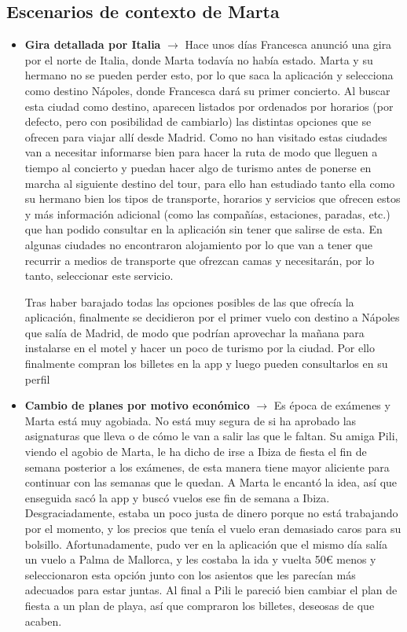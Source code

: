 \subsection{Escenarios de contexto de Marta}
\begin{itemize}
      \item \textbf{Gira detallada por Italia} $\rightarrow$ Hace unos días Francesca anunció una gira por el norte de Italia, donde Marta todavía no había estado. Marta y su hermano no se pueden perder esto, por lo que saca la aplicación y selecciona como destino Nápoles, donde Francesca dará su primer concierto. Al buscar esta ciudad como destino, aparecen listados por ordenados por horarios (por defecto, pero con posibilidad de cambiarlo) las distintas opciones que se ofrecen para viajar allí desde Madrid. Como no han visitado estas ciudades van a necesitar informarse bien para hacer la ruta de modo que lleguen a tiempo al concierto y puedan hacer algo de turismo antes de ponerse en marcha al siguiente destino del tour, para ello han estudiado tanto ella como su hermano bien los tipos de transporte, horarios y servicios que ofrecen estos y más información adicional (como las compañías, estaciones, paradas, etc.) que han podido consultar en la aplicación sin tener que salirse de esta. En algunas ciudades no encontraron alojamiento por lo que van a tener que recurrir a medios de transporte que ofrezcan camas y necesitarán, por lo tanto, seleccionar este servicio.

            Tras haber barajado todas las opciones posibles de las que ofrecía la
            aplicación, finalmente se decidieron por el primer vuelo con destino a Nápoles
            que salía de Madrid, de modo que podrían aprovechar la mañana para instalarse
            en el motel y hacer un poco de turismo por la ciudad. Por ello finalmente
            compran los billetes en la app y luego pueden consultarlos en su perfil

      \item \textbf{Cambio de planes por motivo económico} $\rightarrow$ Es época de exámenes y Marta está muy agobiada. No está muy segura de si ha aprobado las asignaturas que lleva o de cómo le van a salir las que le faltan. Su amiga Pili, viendo el agobio de Marta, le ha dicho de irse a Ibiza de fiesta el fin de semana posterior a los exámenes, de esta manera tiene mayor aliciente para continuar con las semanas que le quedan. A Marta le encantó la idea, así que enseguida sacó la app y buscó vuelos ese fin de semana a Ibiza. Desgraciadamente, estaba un poco justa de dinero porque no está trabajando por el momento, y los precios que tenía el vuelo eran demasiado caros para su bolsillo. Afortunadamente, pudo ver en la aplicación que el mismo día salía un vuelo a Palma de Mallorca, y les costaba la ida y vuelta 50€ menos y seleccionaron esta opción junto con los asientos que les parecían más adecuados para estar juntas. Al final a Pili le pareció bien cambiar el plan de fiesta a un plan de playa, así que compraron los billetes, deseosas de que acaben.
\end{itemize}
